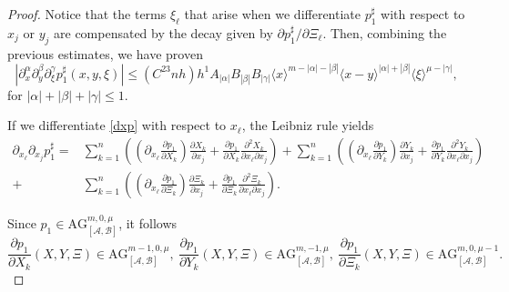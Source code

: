 \documentclass[10pt,a4paper]{amsart}
\newcommand{\AG}{{\mathrm{AG}}}
\newcommand{\A}{{\mathcal{A}}} %
\newcommand{\B}{{\mathcal{B}}} %
\begin{document}
\begin{proof}
	Notice that the terms $\xi_\ell$ that arise when we differentiate $p_1^\sharp$ with respect to $x_j$ or $y_j$ are compensated by the decay given by 
	$\partial p_1^\sharp/\partial\Xi_\ell$. Then, combining the previous estimates, we have proven
	\begin{equation}\label{est_1st}
		\left| \partial^\alpha_x\partial^\beta_y\partial^\gamma_\xi p_1^\sharp(x,y,\xi) \right|\leq (C^23nh)h^1 A_{|\alpha|}B_{|\beta|}B_{|\gamma|} 
		 \langle x\rangle^{m-|\alpha|-|\beta|}\langle x-y\rangle^{|\alpha|+|\beta|} \langle\xi\rangle^{\mu-|\gamma|},
	\end{equation}
	for $|\alpha|+|\beta|+|\gamma|\leq 1$.
	
	If we differentiate \eqref{dxp} with respect to $x_\ell$, the Leibniz rule yields
	\begin{align*}\label{dxxp}
		\partial_{x_\ell}\partial_{x_j}p_1^\sharp = & \sum_{k=1}^n \left( \left(\partial_{x_\ell}\frac{\partial p_1}{\partial X_k}\right)\frac{\partial X_k}{\partial x_j}+\frac{\partial p_1}{\partial X_k}\frac{\partial^2 X_k}{\partial x_\ell\partial x_j}\right) + \sum_{k=1}^{n}\left( \left(\partial_{x_\ell}\frac{\partial p_1}{\partial Y_k}\right)\frac{\partial Y_k}{\partial x_j}+\frac{\partial p_1}{\partial Y_k}\frac{\partial^2 Y_k}{\partial x_\ell\partial x_j}\right)\\
		 + &\sum_{k=1}^{n}\left( \left(\partial_{x_\ell}\frac{\partial p_1}{\partial \Xi_k}\right)\frac{\partial \Xi_k}{\partial x_j}+\frac{\partial p_1}{\partial \Xi_k}\frac{\partial^2 \Xi_k}{\partial x_\ell\partial x_j}\right). 
	\end{align*}
	
	Since $p_1\in \AG_{[\A,\B]}^{m,0,\mu}$, it follows
	\[
	\frac{\partial p_1}{\partial X_k}(X,Y,\Xi)\in \AG_{[\A,\B]}^{m-1,0,\mu},\ 
	\frac{\partial p_1}{\partial Y_k}(X,Y,\Xi)\in \AG_{[\A,\B]}^{m,-1,\mu},\ 
	\frac{\partial p_1}{\partial \Xi_k}(X,Y,\Xi)\in \AG_{[\A,\B]}^{m,0,\mu-1}.
	\]
	

\end{proof}
\end{document}
